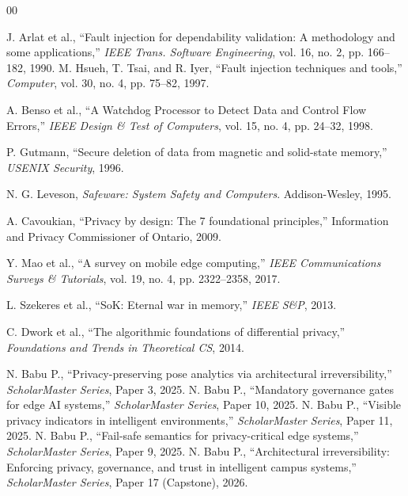 \documentclass[conference]{IEEEtran}
\begin{document}
\begin{thebibliography}{00}

 J. Arlat et al., ``Fault injection for dependability validation: A methodology and some applications,'' \textit{IEEE Trans. Software Engineering}, vol. 16, no. 2, pp. 166--182, 1990.
 M. Hsueh, T. Tsai, and R. Iyer, ``Fault injection techniques and tools,'' \textit{Computer}, vol. 30, no. 4, pp. 75--82, 1997.

 A. Benso et al., ``A Watchdog Processor to Detect Data and Control Flow Errors,'' \textit{IEEE Design \& Test of Computers}, vol. 15, no. 4, pp. 24--32, 1998.

 P. Gutmann, ``Secure deletion of data from magnetic and solid-state memory,'' \textit{USENIX Security}, 1996.

 N. G. Leveson, \textit{Safeware: System Safety and Computers}. Addison-Wesley, 1995.

 A. Cavoukian, ``Privacy by design: The 7 foundational principles,'' Information and Privacy Commissioner of Ontario, 2009.

 Y. Mao et al., ``A survey on mobile edge computing,'' \textit{IEEE Communications Surveys \& Tutorials}, vol. 19, no. 4, pp. 2322--2358, 2017.

 L. Szekeres et al., ``SoK: Eternal war in memory,'' \textit{IEEE S\&P}, 2013.

 C. Dwork et al., ``The algorithmic foundations of differential privacy,'' \textit{Foundations and Trends in Theoretical CS}, 2014.

 N. Babu P., ``Privacy-preserving pose analytics via architectural irreversibility,'' \textit{ScholarMaster Series}, Paper 3, 2025.
 N. Babu P., ``Mandatory governance gates for edge AI systems,'' \textit{ScholarMaster Series}, Paper 10, 2025.
 N. Babu P., ``Visible privacy indicators in intelligent environments,'' \textit{ScholarMaster Series}, Paper 11, 2025.
 N. Babu P., ``Fail-safe semantics for privacy-critical edge systems,'' \textit{ScholarMaster Series}, Paper 9, 2025.
 N. Babu P., ``Architectural irreversibility: Enforcing privacy, governance, and trust in intelligent campus systems,'' \textit{ScholarMaster Series}, Paper 17 (Capstone), 2026.


\end{thebibliography}
\end{document}
